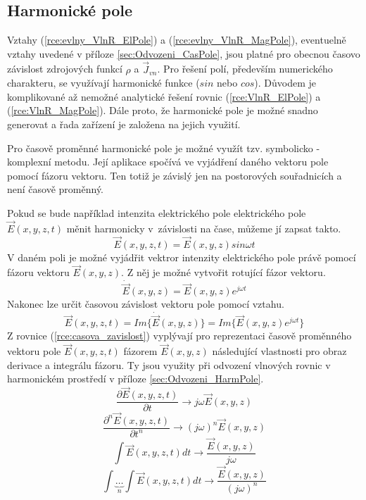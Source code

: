 \subsection{Harmonické pole}
Vztahy (\ref{rce:evlny_VlnR_ElPole}) a (\ref{rce:evlny_VlnR_MagPole}), eventuelně vztahy uvedené v příloze \ref{sec:Odvozeni_CasPole}, jsou platné pro obecnou časovo závislost zdrojových funkcí $\rho$ a $\vec J_{vn}$. Pro řešení polí, především numerického charakteru, se využívají harmonické funkce ($sin$ nebo $cos$). Důvodem je komplikované až nemožné analytické řešení rovnic (\ref{rce:VlnR_ElPole}) a (\ref{rce:VlnR_MagPole}). Dále proto, že harmonické pole je možné snadno generovat a řada zařízení je založena na jejich využití. 

Pro časově proměnné harmonické pole je možné využít tzv. symbolicko - komplexní metodu. Její aplikace spočívá ve vyjádření daného vektoru pole pomocí fázoru vektoru. Ten totiž je závislý jen na postorových souřadnicích a není časově proměnný.

Pokud se bude například intenzita elektrického pole elektrického pole $\vec E(x,y,z,t)$ měnit harmonicky v~závislosti na čase, můžeme jí zapsat takto.
\begin{displaymath}
	\vec E(x,y,z,t) = \vec E(x,y,z)sin\omega t
\end{displaymath}
V daném poli je možné vyjádřit vektror intenzity elektrického pole právě pomocí fázoru vektoru $\vec E(x,y,z)$. Z něj je možné vytvořit rotující fázor vektoru.
\begin{equation}
	\dot{\vec E}(x,y,z) = \vec E(x,y,z)e^{j\omega t}
	\label{rce:rotujici_fazor_vektoru}
\end{equation}
Nakonec lze určit časovou závislost vektoru pole pomocí vztahu.
\begin{equation}
	\vec E(x,y,z,t) = Im\Big\{ \dot{\vec E}(x,y,z)\Big\} = Im\Big\{ \vec E(x,y,z)e^{j\omega t}\Big\}
	\label{rce:casova_zavislost}
\end{equation}
Z rovnice (\ref{rce:casova_zavislost}) vyplývají pro reprezentaci časově proměnného vektoru pole $\vec E(x,y,z,t)$ fázorem $\vec E(x,y,z)$ následující vlastnosti pro obraz derivace a integrálu fázoru. Ty jsou využity při odvození vlnových rovnic v harmonickém prostředí v příloze \ref{sec:Odvozeni_HarmPole}.
\begin{displaymath}
	\frac{\partial \vec E(x,y,z,t)}{\partial t} \longrightarrow j\omega \vec E(x,y,z)
\end{displaymath}
\begin{displaymath}
	\frac{\partial^{n} \vec E(x,y,z,t)}{\partial t^{n}} \longrightarrow (j\omega)^{n} \vec E(x,y,z)
\end{displaymath}
\begin{displaymath}
	\int\!\!\vec E(x,y,z,t) dt \longrightarrow \frac{\vec E(x,y,z)}{j\omega}
\end{displaymath}
\begin{displaymath}
	\int\underbrace{\ldots}_{n}\int\!\!\vec E(x,y,z,t) dt \longrightarrow \frac{\vec E(x,y,z)}{(j\omega)^{n}}
\end{displaymath}

